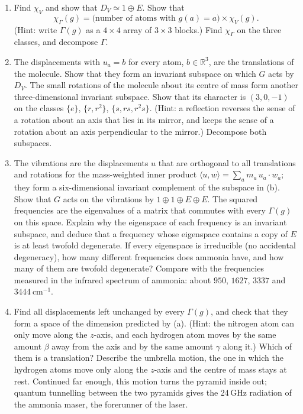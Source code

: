 \documentclass[11pt,a4paper]{article}
\makeatletter
\newcommand{\R}{\mathbb{R}}
\newcommand{\showsolution}[1]{%
  \ifdefined\withsolutions\@ifundefined{sol@#1}{}{%
    \par\vspace{0.6em}\noindent\textbf{Solution.}\par\vspace{0.1em}{\sloppy\@nameuse{sol@#1}\par}\vspace{0.4em}\hrule}\fi}
\makeatother
\begin{document}
\begin{enumerate}
  \item Find $\chi_V$ and show that $D_V \simeq 1 \oplus E$. Show that
  \[
    \chi_\Gamma(g) = \bigl(\text{number of atoms with } g(a) = a\bigr)\times\chi_V(g).
  \]
  (Hint: write $\Gamma(g)$ as a $4 \times 4$ array of $3 \times 3$ blocks.) Find $\chi_\Gamma$ on the three classes, and decompose $\Gamma$.
  \item The displacements with $u_a = b$ for every atom, $b \in \R^3$, are the translations of the molecule. Show that they form an invariant subspace on which $G$ acts by $D_V$. The small rotations of the molecule about its centre of mass form another three-dimensional invariant subspace. Show that its character is $(3, 0, -1)$ on the classes $\{e\}$, $\{r, r^2\}$, $\{s, rs, r^2 s\}$. (Hint: a reflection reverses the sense of a rotation about an axis that lies in its mirror, and keeps the sense of a rotation about an axis perpendicular to the mirror.) Decompose both subspaces.
  \item The vibrations are the displacements $u$ that are orthogonal to all translations and rotations for the mass-weighted inner product $\langle u, w\rangle = \sum_a m_a\, u_a \cdot w_a$; they form a six-dimensional invariant complement of the subspace in (b). Show that $G$ acts on the vibrations by $1 \oplus 1 \oplus E \oplus E$. The squared frequencies are the eigenvalues of a matrix that commutes with every $\Gamma(g)$ on this space. Explain why the eigenspace of each frequency is an invariant subspace, and deduce that a frequency whose eigenspace contains a copy of $E$ is at least twofold degenerate. If every eigenspace is irreducible (no accidental degeneracy), how many different frequencies does ammonia have, and how many of them are twofold degenerate? Compare with the frequencies measured in the infrared spectrum of ammonia: about $950$, $1627$, $3337$ and $3444\ \text{cm}^{-1}$.
  \item Find all displacements left unchanged by every $\Gamma(g)$, and check that they form a space of the dimension predicted by (a). (Hint: the nitrogen atom can only move along the $z$-axis, and each hydrogen atom moves by the same amount $\beta$ away from the axis and by the same amount $\gamma$ along it.) Which of them is a translation? Describe the umbrella motion, the one in which the hydrogen atoms move only along the $z$-axis and the centre of mass stays at rest. Continued far enough, this motion turns the pyramid inside out; quantum tunnelling between the two pyramids gives the 24\,GHz radiation of the ammonia maser, the forerunner of the laser.
\end{enumerate}
\showsolution{27}
\end{document}
